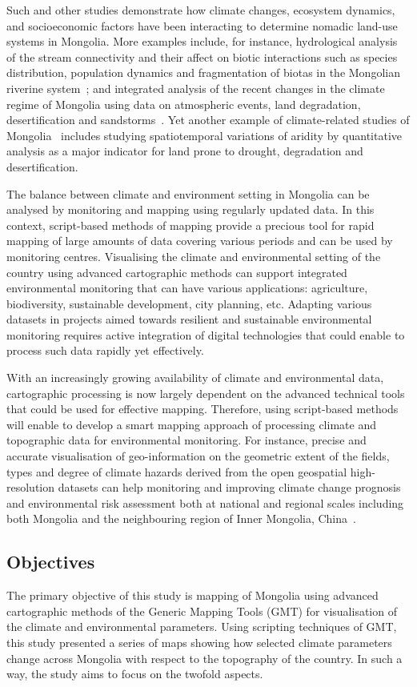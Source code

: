 \documentclass[geosciences,article,accept,pdftex,oneauthor]{Definitions/mdpi}
\begin{document}
Such and other studies demonstrate how climate changes, ecosystem dynamics, and socioeconomic factors have been interacting to determine nomadic land-use systems in Mongolia. More examples include, for instance, hydrological analysis of the stream connectivity and their affect on biotic interactions such as species distribution, population dynamics and fragmentation of biotas in the Mongolian riverine system~\cite{Maasri}; and integrated analysis of the recent changes in the climate regime of Mongolia using data on atmospheric events, land degradation, desertification and sandstorms~\cite{Hanetal}. Yet another example of climate-related studies of Mongolia~\cite{Nyamtseren} includes studying spatiotemporal variations of aridity by quantitative analysis as a major indicator for land prone to drought, degradation and desertification.

{The balance between climate and environment setting in Mongolia can be analysed by monitoring and mapping using regularly updated data. In this context, script-based methods of mapping provide a precious tool for rapid mapping of large amounts of data covering various periods and can be used by monitoring centres. Visualising the climate and environmental setting of the country using advanced cartographic methods can support integrated environmental monitoring that can have various applications: agriculture, biodiversity, sustainable development, city planning, etc. Adapting various datasets in projects aimed towards resilient and sustainable environmental monitoring requires active integration of digital technologies that could enable to process such data rapidly yet effectively.}

With an increasingly growing availability of climate and environmental data, cartographic processing is now largely dependent on the advanced technical tools that could be used for effective mapping. Therefore, using script-based methods will enable to develop a smart mapping approach of processing climate and topographic data for environmental monitoring. For instance, precise and accurate visualisation of geo-information on the geometric extent of the fields, types and degree of climate hazards derived from the open geospatial high-resolution datasets can help monitoring and improving climate change prognosis and environmental risk assessment both at national and regional scales including both Mongolia and the neighbouring region of Inner Mongolia, China~\cite{JIE2021353,5631071,5964785}. 

\subsection{Objectives}
The primary objective of this study is mapping of Mongolia using advanced cartographic methods of the Generic Mapping Tools (GMT) for visualisation of the climate and environmental parameters. Using scripting techniques of GMT, this study presented a series of maps showing how selected climate parameters change across Mongolia with respect to the topography of the country. In such a way, the study aims to focus on the twofold aspects.
\end{document}
